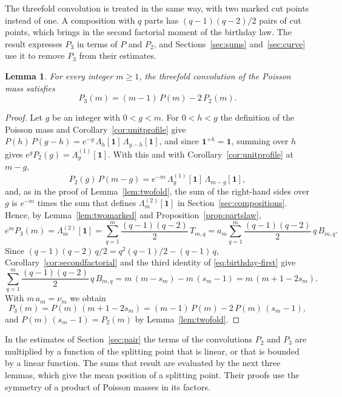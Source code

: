 \documentclass{amsart}
\makeatletter
\newtheorem{lemma}[theorem]{Lemma}
\theoremstyle{definition}
\theoremstyle{remark}
\numberwithin{equation}{section}
\def\subsection{\@startsection{subsection}{2}\z@{.5\linespacing\@plus.7\linespacing}{-.5em}{\normalfont\bfseries\boldmath}}
\makeatother
\begin{document}
The threefold convolution is treated in the same way, with two marked cut
points instead of one. A composition with $q$ parts has
$(q-1)(q-2)/2$ pairs of cut points, which brings in the second factorial
moment of the birthday law. The result expresses $P_3$ in terms of $P$ and
$P_2$, and Sections~\ref{sec:sums} and~\ref{sec:curve} use it to remove
$P_3$ from their estimates.

\begin{lemma}\label{lem:threefold}
For every integer $m\ge1$, the threefold convolution of the Poisson mass
satisfies
\[
P_3(m)=(m-1)\,P(m)-2\,P_2(m).
\]
\end{lemma}

\begin{proof}
Let $g$ be an integer with $0<g<m$. For $0<h<g$ the definition of the
Poisson mass and Corollary~\ref{cor:unitprofile} give
$P(h)\,P(g-h)=e^{-g}\,\Lambda_h[\mathbf 1]\,\Lambda_{g-h}[\mathbf 1]$, and
since $\mathbf 1^{+h}=\mathbf 1$, summing over $h$ gives
$e^{g}P_2(g)=\Lambda^{(1)}_g[\mathbf 1]$. With this and with
Corollary~\ref{cor:unitprofile} at $m-g$,
\[
P_2(g)\,P(m-g)=e^{-m}\,\Lambda^{(1)}_g[\mathbf 1]\,
\Lambda_{m-g}[\mathbf 1],
\]
and, as in the proof of Lemma~\ref{lem:twofold}, the sum of the right-hand
sides over $g$ is $e^{-m}$ times the sum that defines
$\Lambda^{(2)}_m[\mathbf 1]$ in Section~\ref{sec:compositions}. Hence, by
Lemma~\ref{lem:twomarked} and Proposition~\ref{prop:partslaw},
\[
e^{m}P_3(m)=\Lambda^{(2)}_m[\mathbf 1]
=\sum_{q=1}^{m}\frac{(q-1)(q-2)}{2}\,T_{m,q}
=a_m\sum_{q=1}^{m}\frac{(q-1)(q-2)}{2}\,q\,B_{m,q}.
\]
Since $(q-1)(q-2)\,q/2=q^{2}(q-1)/2-(q-1)\,q$,
Corollary~\ref{cor:secondfactorial} and the third identity of
\eqref{eq:birthday-first} give
\[
\sum_{q=1}^{m}\frac{(q-1)(q-2)}{2}\,q\,B_{m,q}
=m\,(m-s_m)-m\,(s_m-1)=m\,(m+1-2s_m).
\]
With $m\,a_m=\nu_m$ we obtain
\[
P_3(m)=P(m)\,(m+1-2s_m)=(m-1)\,P(m)-2\,P(m)\,(s_m-1),
\]
and $P(m)\,(s_m-1)=P_2(m)$ by Lemma~\ref{lem:twofold}.
\end{proof}

\subsection{Mean positions}\label{subsec:birthday-means}

In the estimates of Section~\ref{sec:pair} the terms of the convolutions
$P_2$ and $P_3$ are multiplied by a function of the splitting point that is
linear, or that is bounded by a linear function. The sums that result are
evaluated by the next three lemmas, which give the mean position of a
splitting point. Their proofs use the symmetry of a product of Poisson
masses in its factors.
\end{document}

